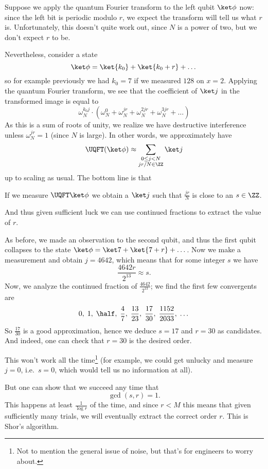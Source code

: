 Suppose we apply the quantum Fourier transform to the left qubit $\ket\phi$ now:
since the left bit is periodic modulo $r$, we expect the transform
will tell us what $r$ is.
Unfortunately, this doesn't quite work out, since $N$ is a power of two,
but we don't expect $r$ to be.

Nevertheless, consider a state
\[ \ket\phi = \ket{k_0} + \ket{k_0+r} + \dots \]
so for example previously we had $k_0=7$ if we measured $128$ on $x=2$.
Applying the quantum Fourier transform, we see that the
coefficient of $\ket j$ in the transformed image is equal to
\[
	\omega_N^{k_0j} \cdot
	\left( \omega_N^{0} + \omega_N^{jr} + \omega_N^{2jr}
	+ \omega_N^{3jr} + \dots \right)
\]
As this is a sum of roots of unity, we realize we have
destructive interference unless $\omega_N^{jr} = 1$ (since $N$ is large).
In other words, we approximately have
\[
	\UQFT(\ket\phi)
	\approx
	\sum_{\substack{0 \le j < N \\ jr/N \in \ZZ}} \ket j
\]
up to scaling as usual.
The bottom line is that
\begin{moral}
	If we measure $\UQFT\ket\phi$ we obtain a $\ket j$ such that
	$\frac{jr}{N}$ is close to an $s \in \ZZ$.
\end{moral}
And thus given sufficient luck we can use continued fractions
to extract the value of $r$.

\begin{example}
	[Finishing the factoring of $M = 77$]
	As before, we made an observation to the second qubit,
	and thus the first qubit collapses to the state
	$\ket\phi = \ket7 + \ket{7+r} + \dots$.
	Now we make a measurement and obtain $j = 4642$, which means that
	for some integer $s$ we have
	\[ \frac{4642r}{2^{13}} \approx s. \]
	Now, we analyze the continued fraction of $\frac{4642}{2^{13}}$;
	we find the first few convergents are
	\[
		0, \;
		1, \;
		\half, \;
		\frac{4}{7}, \;
		\frac{13}{23}, \;
		\frac{17}{30}, \;
		\frac{1152}{2033}, \;
		\dots
	\]
	So $\frac{17}{30}$ is a good approximation,
	hence we deduce $s = 17$ and $r = 30$ as candidates.
	And indeed, one can check that $r = 30$ is the desired order.
\end{example}

This won't work all the time\footnote{%
	Not to mention the general issue of noise, but that's for
	engineers to worry about.
} (for example, we could get unlucky and
measure $j=0$, i.e.\ $s=0$, which would tell us no information at all).

But one can show that we succeed any time that \[ \gcd(s,r) = 1. \]
This happens at least $\frac{1}{\log r}$ of the time,
and since $r < M$ this means that given sufficiently many trials,
we will eventually extract the correct order $r$.
This is Shor's algorithm.
